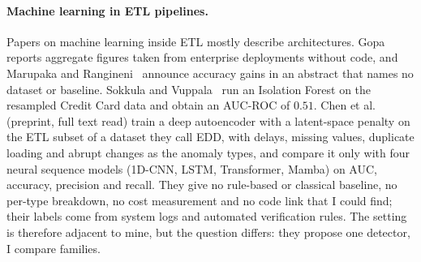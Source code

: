\documentclass[conference]{IEEEtran}
\begin{document}
\paragraph{Machine learning in ETL pipelines.}
Papers on machine learning inside ETL
mostly describe architectures. Gopa~\cite{gopa2025aiaugmented} reports aggregate
figures taken from enterprise deployments without code, and
Marupaka and Rangineni~\cite{marupaka2024mlpredictive} announce accuracy gains in
an abstract that names no dataset or baseline. Sokkula and
Vuppala~\cite{sokkula2024implementing} run an Isolation Forest on the
resampled Credit Card data and obtain an AUC-ROC of $0.51$.
Chen et al.~\cite{chen2025etlautoencoder} (preprint, full text read) train a deep
autoencoder with a latent-space penalty on the ETL subset of a dataset they call EDD, with
delays, missing values, duplicate loading and abrupt changes as the anomaly
types, and compare it only with four neural sequence models (1D-CNN, LSTM,
Transformer, Mamba) on AUC, accuracy, precision and recall. They give no rule-based or
classical baseline, no per-type breakdown, no cost measurement and no code link
that I could find; their labels come from system logs and automated verification
rules. The setting is therefore adjacent to mine, but the question differs: they
propose one detector, I compare families.
\end{document}
